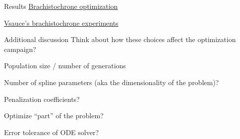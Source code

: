 \documentclass[presentation]{beamer}
\begin{document}
\begin{frame}[label={sec:org5724392}]{Results}
\href{file:///Users/tp5/code/optex/brachistochrone.mp4}{Brachistochrone optimization}

\href{https://www.youtube.com/watch?v=skvnj67YGmw\&feature=youtu.be\&t=17m30s}{Vsauce's brachistochrone experiments}
\end{frame}

\begin{frame}[label={sec:org71b1b5e}]{Additional discussion}
Think about how these choices affect the optimization campaign?
\begin{block}{Population size / number of generations}
\end{block}
\begin{block}{Number of spline parameters (aka the dimensionality of the problem)?}
\end{block}
\begin{block}{Penalization coefficients?}
\end{block}
\begin{block}{Optimize ``part'' of the problem?}
\end{block}
\begin{block}{Error tolerance of ODE solver?}
\end{block}
\end{frame}
\end{document}

